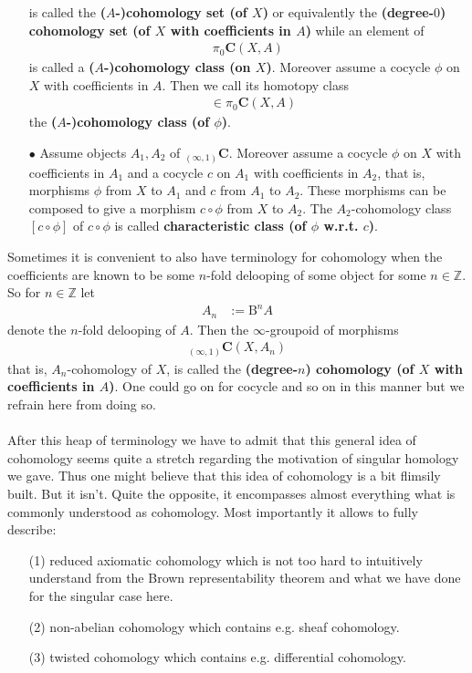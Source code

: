 \begin{enumerate}
is called the \textbf{($A$-)cohomology set (of $X$)} or equivalently the \textbf{(degree-$0$) cohomology set (of $X$ with coefficients in $A$)} while an element of
\begin{align*}
  \pi_{0}
  \mathbf{C}
  \left(
    X,
    A
  \right)
\end{align*}
is called a \textbf{($A$-)cohomology class (on $X$)}. Moreover assume a cocycle $\phi$ on $X$ with coefficients in $A$. Then we call its homotopy class
\begin{align*}
  [\phi]
  &\in
  \pi_{0}
  \mathbf{C}
  \left(
    X,
    A
  \right)
\end{align*}
the \textbf{($A$-)cohomology class (of $\phi$)}.
\item[$\bullet$]
Assume objects $A_{1},A_{2}$ of ${}_{(\infty,1)}\mathbf{C}$. Moreover assume a cocycle $\phi$ on $X$ with coefficients in $A_{1}$ and a cocycle $c$ on $A_{1}$ with coefficients in $A_{2}$, that is, morphisms $\phi$ from $X$ to $A_{1}$ and $c$ from $A_{1}$ to $A_{2}$. These morphisms can be composed to give a morphism $c \circ \phi$ from $X$ to $A_{2}$. The $A_{2}$-cohomology class $[c \circ \phi]$ of $c \circ \phi$ is called \textbf{characteristic class (of $\phi$ w.r.t. $c$)}.
\end{enumerate}
Sometimes it is convenient to also have terminology for cohomology when the coefficients are known to be some $n$-fold delooping of some object for some $n \in \mathbb{Z}$. So for $n \in \mathbb{Z}$ let
\begin{align*}
  A_{n}
  &:=
  \mathrm{B}^{n}A
\end{align*}
denote the $n$-fold delooping of $A$. Then the $\infty$-groupoid of morphisms
\begin{align*}
  {}_{(\infty,1)}\mathbf{C}
  \left(
    X,
    A_{n}
  \right)
\end{align*}
that is, $A_{n}$-cohomology of $X$, is called the \textbf{(degree-$n$) cohomology (of $X$ with coefficients in $A$)}. One could go on for cocycle and so on in this manner but we refrain here from doing so.
\\\\
After this heap of terminology we have to admit that this general idea of cohomology seems quite a stretch regarding the motivation of singular homology we gave. Thus one might believe that this idea of cohomology is a bit flimsily built. But it isn't. Quite the opposite, it encompasses almost everything what is commonly understood as cohomology. Most importantly it allows to fully describe:
\begin{enumerate}
\item[(1)]
reduced axiomatic cohomology which is not too hard to intuitively understand from the Brown representability theorem and what we have done for the singular case here.
\item[(2)]
non-abelian cohomology which contains e.g. sheaf cohomology.
\item[(3)]
twisted cohomology which contains e.g. differential cohomology.
\end{enumerate}
